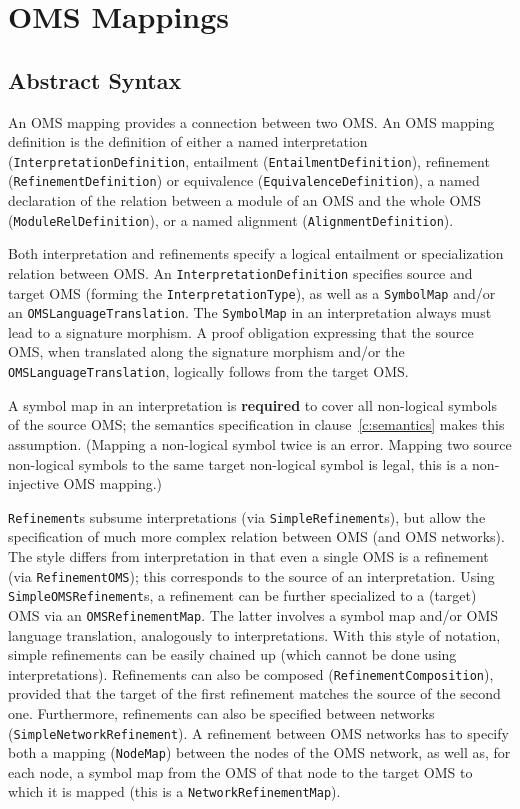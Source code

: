 \documentclass[10pt,fleqn,final]{scrreprt}
\newcommand*{\termref}[1]{\index{#1}#1\xspace}
\newcommand*{\syntax}[1]{\texttt{#1}}
\newcommand*{\required}{\textbf{required}\xspace}
\newcommand{\clauserefname}{clause}
\newcommand{\cref}[1]{\clauserefname~\ref{#1}}
\newcommand{\sclause}[1]{\section{#1}}
\newcommand{\ssclause}[1]{\subsection{#1}}
\newenvironment{definitions}[0]{\medskip }{}
\begin{document}
\begin{definitions}
\sclause{OMS Mappings}\label{c:oms-mappings}
\ssclause{Abstract Syntax}


An OMS mapping provides a connection between two OMS. An OMS mapping
definition is the definition of either a named interpretation
(\syntax{InterpretationDefinition}, entailment (\syntax{EntailmentDefinition}),
refinement (\syntax{RefinementDefinition}) or equivalence
(\syntax{EquivalenceDefinition}), a named declaration of the relation
between a module of an OMS and the whole OMS
(\syntax{ModuleRelDefinition}), or a named \termref{alignment}
(\syntax{AlignmentDefinition}).

Both interpretation and refinements specify a logical entailment or
specialization relation between OMS. An
\syntax{InterpretationDefinition} specifies source and target OMS
(forming the \syntax{InterpretationType}), as well as a
\syntax{SymbolMap} and/or an \syntax{OMSLanguageTranslation}.  The
\syntax{SymbolMap} in an interpretation always must lead to a
signature morphism. A proof obligation expressing that the source OMS,
when translated along the signature morphism and/or the
\syntax{OMSLanguageTranslation}, logically follows from the target OMS.

A symbol map in an interpretation is \required to cover all
non-logical symbols of the source OMS; the semantics specification in
\cref{c:semantics} makes this assumption. ({Mapping a non-logical
  symbol twice is an error. Mapping two source non-logical symbols to
  the same target non-logical symbol is legal, this is a non-injective
  OMS mapping.})

\syntax{Refinement}s subsume interpretations (via
\syntax{SimpleRefinement}s), but allow the specification of much more
complex relation between OMS (and OMS networks).  The style differs
from interpretation in that even a single OMS is a refinement (via
\syntax{RefinementOMS}); this corresponds to the source of an
interpretation. Using \syntax{SimpleOMSRefinement}s, a refinement can
be further specialized to a (target) OMS via an
\syntax{OMSRefinementMap}. The latter involves a symbol map and/or OMS
language translation, analogously to interpretations.  With this style
of notation, simple refinements can be easily chained up (which cannot
be done using interpretations).  Refinements can also be composed
(\syntax{RefinementComposition}), provided that the target of the
first refinement matches the source of the second one. Furthermore,
refinements can also be specified between networks
(\syntax{SimpleNetworkRefinement}).  A refinement between OMS networks
has to specify both a mapping (\syntax{NodeMap}) between the nodes of
the OMS network, as well as, for each node, a symbol map from the OMS
of that node to the target OMS to which it is mapped (this is a
\syntax{NetworkRefinementMap}). 


\end{definitions}
\end{document}
